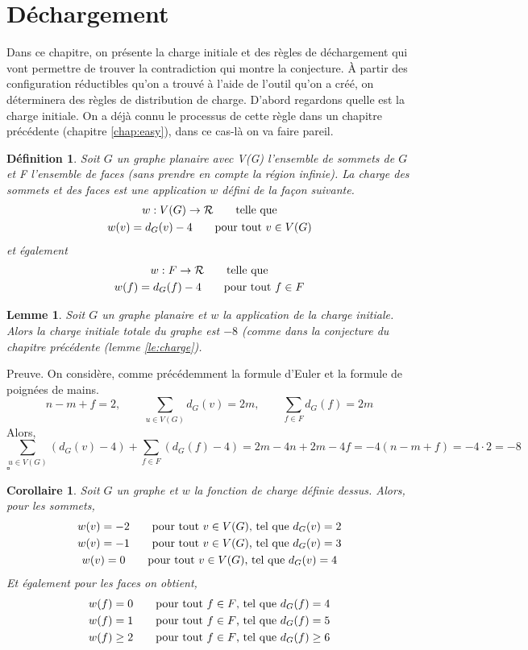 \documentclass[10pt,a4paper]{article}
\newtheorem{definition}{Définition}
\newtheorem{lemme}{Lemme}
\newtheorem{corollaire}{Corollaire}
\newcommand{\ep}{{\hfill $\square$}}
\begin{document}
\section{Déchargement}

Dans ce chapitre, on présente la charge initiale et des règles de déchargement qui vont permettre de trouver la contradiction qui montre la conjecture. \` A partir des configuration réductibles qu'on a trouvé à l'aide de l'outil qu'on a créé, on déterminera des règles de distribution de charge. D'abord regardons quelle est la charge initiale. On a déjà connu le processus de cette règle dans un chapitre précédente (chapitre \ref{chap:easy}), dans ce cas-là on va faire pareil.

\begin{definition}
Soit $G$ un graphe planaire avec V(G) l'ensemble de sommets de $G$ et F l'ensemble de faces (sans prendre en compte la région infinie). La \emph{charge} des sommets et des faces est une application $w$ défini de la façon suivante.
$$
\gathered
w: V(G) \to \mathcal{R} \qquad \textrm{telle que}\\
w(v) = d_G(v) - 4 \qquad \textrm{pour tout $v \in V(G)$}\\
\endgathered
$$
et également
$$
\gathered
w: F \to \mathcal{R} \qquad \textrm{telle que}\\
w(f) = d_G(f) - 4 \qquad \textrm{pour tout $f \in F$}\\
\endgathered
$$
\end{definition}

\begin{lemme}
Soit $G$ un graphe planaire et $w$ la application de la charge initiale. Alors la charge initiale totale du graphe est $-8$ (comme dans la conjecture du chapitre précédente (lemme \ref{le:charge}).
\end{lemme}

Preuve.
On considère, comme précédemment la formule d'Euler et la formule de poignées de mains.
$$
n - m + f = 2, \qquad \sum_{u \in V(G)} d_G(v) = 2m, \qquad \sum_{f \in F} d_G(f) = 2m
$$
Alors,
$$
\sum_{u \in V(G)} (d_G(v) - 4) + \sum_{f \in F} (d_G(f) - 4) = 2m - 4n + 2m - 4f = -4( n - m + f) = -4 \cdot 2 = -8
$$
\ep

\begin{corollaire}
Soit $G$ un graphe et $w$ la fonction de charge définie dessus. Alors, pour les sommets,
$$
\gathered
w(v) = -2 \qquad \textrm{pour tout $v \in V(G)$, tel que  } d_G(v) = 2\\
w(v) = -1 \qquad \textrm{pour tout $v \in V(G)$, tel que  } d_G(v) = 3\\
w(v) = 0 \qquad \textrm{pour tout $v \in V(G)$, tel que  } d_G(v) = 4
\endgathered
$$
Et également pour les faces on obtient,
$$
\gathered
w(f) = 0 \qquad \textrm{pour tout $f \in F$, tel que  } d_G(f) = 4\\
w(f) = 1 \qquad \textrm{pour tout $f \in F$, tel que  } d_G(f) = 5\\
w(f) \geq 2 \qquad \textrm{pour tout $f \in F$, tel que  } d_G(f) \geq 6
\endgathered
$$
\end{corollaire}
\end{document}

